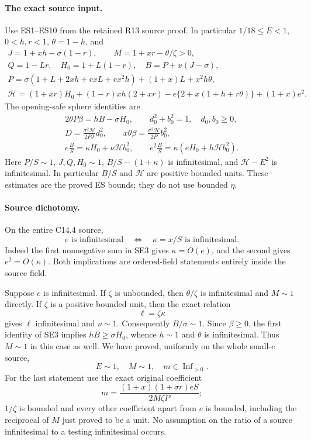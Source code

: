 \paragraph{The exact source input.}
Use ES1--ES10 from the retained R13 source proof. In particular
$1/18\le E<1$, $0<h,r<1$, $\theta=1-h$, and
\[
\begin{gathered}
 J=1+xh-\sigma(1-r),\qquad M=1+xr-\theta/\zeta>0,\\
 Q=1-Lr,\quad H_0=1+L(1-r),\quad B=P+x(J-\sigma),\\
 P=\sigma(1+L+2xh+rxL+rx^2h)+(1+x)L+x^2h\theta,\\
 \mathcal H=(1+xr)H_0+(1-r)xh(2+xr)
       -e\{2+x(1+h+r\theta)\}+(1+x)e^2.
\end{gathered} \tag{SE2}
\]
The opening-safe sphere identities are
\[
\begin{gathered}
 2\theta P\beta=hB-\sigma H_0,\qquad
 d_0^2+b_0^2=1,\quad d_0,b_0\ge0,\\
 D=\frac{\sigma^2\mathcal H}{2PJ}d_0^2,\qquad
 x\theta\beta=\frac{\sigma^2\mathcal H}{2P}b_0^2,\\
 e\frac BS=\kappa H_0+\nu\mathcal H b_0^2,\qquad
 e^2\frac BS=\kappa(eH_0+h\mathcal H b_0^2).
\end{gathered}\tag{SE3}
\]
Here $P/S\sim1$, $J,Q,H_0\sim1$, $B/S-(1+\kappa)$ is
infinitesimal, and $\mathcal H-E^2$ is infinitesimal. In particular
$B/S$ and $\mathcal H$ are positive bounded units. These estimates
are the proved ES bounds; they do not use bounded $\eta$.

\paragraph{Source dichotomy.}
On the entire C14.4 source,
\[
 e\text{ is infinitesimal}\quad\Longleftrightarrow\quad
 \kappa=x/S\text{ is infinitesimal}.\tag{SE4}
\]
Indeed the first nonnegative sum in SE3 gives $\kappa=O(e)$,
and the second gives $e^2=O(\kappa)$. Both implications are
ordered-field statements entirely inside the source field.

Suppose $e$ is infinitesimal. If $\zeta$ is unbounded, then
$\theta/\zeta$ is infinitesimal and $M\sim1$ directly. If $\zeta$
is a positive bounded unit, then the exact relation
\[
                  \ell=\zeta\kappa\tag{SE5}
\]
gives $\ell$ infinitesimal and $\nu\sim1$. Consequently
$B/\sigma\sim1$. Since $\beta\ge0$, the first identity of SE3
implies $hB\ge\sigma H_0$, whence $h\sim1$ and $\theta$ is
infinitesimal. Thus $M\sim1$ in this case as well. We have proved,
uniformly on the whole small-$e$ source,
\[
                    E\sim1,\quad M\sim1,\quad m\in\operatorname{Inf}_{>0}.
                    \tag{SE6}
\]
For the last statement use the exact original coefficient
\[
 m=\frac{(1+x)(1+\sigma r)eS}{2M\zeta P};\tag{SE7}
\]
$1/\zeta$ is bounded and every other coefficient apart from $e$ is
bounded, including the reciprocal of $M$ just proved to be a unit.
No assumption on the ratio of a source infinitesimal to a testing
infinitesimal occurs.

